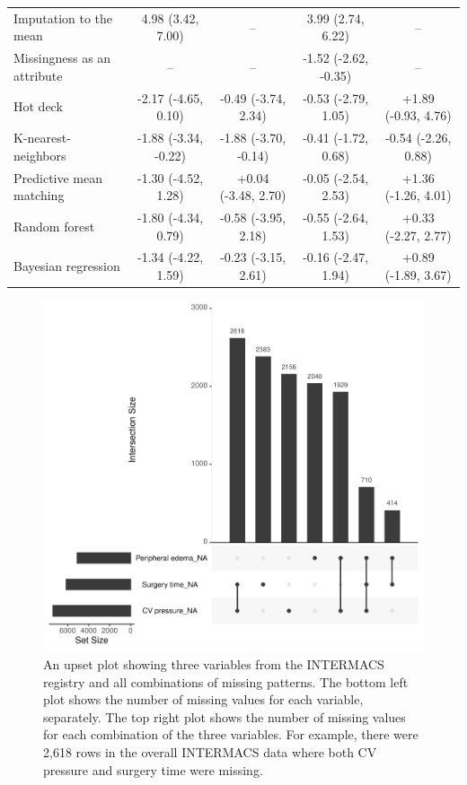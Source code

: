 \documentclass{article}
\begin{document}
\begin{table}
\begin{tabular}{lcccc}
\midrule
Imputation to the mean & 4.98 (3.42, 7.00) & -- & 3.99 (2.74, 6.22) & -- \\ 
Missingness as an attribute & -- & -- & -1.52 (-2.62, -0.35) & -- \\ 
Hot deck & -2.17 (-4.65, 0.10) & -0.49 (-3.74, 2.34) & -0.53 (-2.79, 1.05) & +1.89 (-0.93, 4.76) \\ 
K-nearest-neighbors & -1.88 (-3.34, -0.22) & -1.88 (-3.70, -0.14) & -0.41 (-1.72, 0.68) & -0.54 (-2.26, 0.88) \\ 
Predictive mean matching & -1.30 (-4.52, 1.28) & +0.04 (-3.48, 2.70) & -0.05 (-2.54, 2.53) & +1.36 (-1.26, 4.01) \\ 
Random forest & -1.80 (-4.34, 0.79) & -0.58 (-3.95, 2.18) & -0.55 (-2.64, 1.53) & +0.33 (-2.27, 2.77) \\ 
Bayesian regression & -1.34 (-4.22, 1.59) & -0.23 (-3.15, 2.61) & -0.16 (-2.47, 1.94) & +0.89 (-1.89, 3.67) \\ 
\bottomrule
\end{tabular} 
 \end{table}

\clearpage

\begin{figure}

{\centering \includegraphics{doc_arxiv_files/figure-latex/upset-1} 

}

\caption{An upset plot showing three variables from the INTERMACS registry and all combinations of missing patterns. The bottom left plot shows the number of missing values for each variable, separately. The top right plot shows the number of missing values for each combination of the three variables. For example, there were 2,618 rows in the overall INTERMACS data where both CV pressure and surgery time were missing.}\label{fig:upset}
\end{figure}
\end{document}
